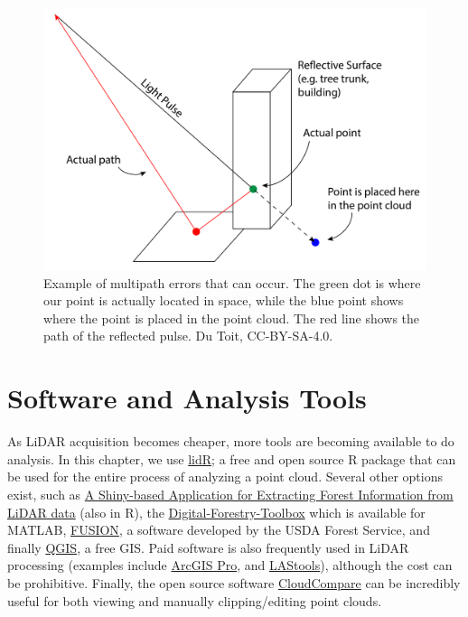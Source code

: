 \documentclass[
]{book}
\begin{document}
\begin{figure}
\includegraphics[width=0.7\linewidth]{images/15-Multipath-Error} \caption{Example of multipath errors that can occur. The green dot is where our point is actually located in space, while the blue point shows where the point is placed in the point cloud. The red line shows the path of the reflected pulse. Du Toit, CC-BY-SA-4.0.}\label{fig:15-multipath-error}
\end{figure}

\section{Software and Analysis Tools}\label{software-and-analysis-tools}

As LiDAR acquisition becomes cheaper, more tools are becoming available to do analysis. In this chapter, we use \href{https://cran.r-project.org/web/packages/lidR/}{lidR}; a free and open source R package that can be used for the entire process of analyzing a point cloud. Several other options exist, such as \href{https://github.com/carlos-alberto-silva/weblidar-treetop}{A Shiny-based Application for Extracting Forest Information from LiDAR data} (also in R), the \href{http://mparkan.github.io/Digital-Forestry-Toolbox/}{Digital-Forestry-Toolbox} which is available for MATLAB, \href{http://forsys.cfr.washington.edu/fusion/fusion_overview.html}{FUSION}, a software developed by the USDA Forest Service, and finally \href{https://www.qgis.org/en/site/}{QGIS}, a free GIS. Paid software is also frequently used in LiDAR processing (examples include \href{https://www.esri.com/en-us/home}{ArcGIS Pro}, and \href{https://rapidlasso.com/lastools/}{LAStools}), although the cost can be prohibitive. Finally, the open source software \href{https://www.danielgm.net/cc/}{CloudCompare} can be incredibly useful for both viewing and manually clipping/editing point clouds.
\end{document}
